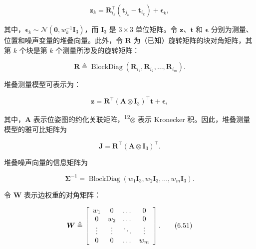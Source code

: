 \begin{equation}
\boldsymbol {z} _ {k} = \boldsymbol {R} _ {i _ {k}} ^ {\top} (\boldsymbol {t} _ {j _ {k}} - \boldsymbol {t} _ {i _ {k}}) + \boldsymbol {\epsilon} _ {k},\tag{6.46}
\end{equation}

其中，$\boldsymbol {\epsilon} _ { k } \sim \mathcal {N} ( \mathbf {0} , w _ { k } ^ { - 1 } \mathbf {I} _ { 3 } )$，而 $\mathbf { I } _ { 3 }$ 是 $3 \times 3$ 单位矩阵。令 $\pmb{z}$、$\pmb{t}$ 和 $\pmb{\epsilon}$ 分别为测量、位置和噪声变量的堆叠向量。此外，令 $\pmb{R}$ 为（已知）旋转矩阵的块对角矩阵，其第 $k$ 个块是第 $k$ 个测量所涉及的旋转矩阵：

\begin{equation}
\boldsymbol {R} \triangleq \operatorname{BlockDiag} \left(\boldsymbol {R} _ {i _ {1}}, \boldsymbol {R} _ {i _ {2}}, \dots , \boldsymbol {R} _ {i _ {m}}\right).\tag{6.47}
\end{equation}

堆叠测量模型可表示为：

\begin{equation}
\pmb {z} = \pmb {R} ^ {\top} (\pmb {A} \otimes \mathbf {I} _ {3}) ^ {\top} \pmb {t} + \pmb {\epsilon},\tag{6.48}
\end{equation}

其中，$\pmb{A}$ 表示位姿图的约化关联矩阵，\textsuperscript{12}$\otimes$ 表示 Kronecker 积。因此，堆叠测量模型的雅可比矩阵为

\begin{equation}
\boldsymbol {J} = \boldsymbol {R} ^ {\top} (\boldsymbol {A} \otimes \mathbf {I} _ {3}) ^ {\top}.\tag{6.49}
\end{equation}

堆叠噪声向量的信息矩阵为

\begin{equation}
\boldsymbol {\Sigma} ^ {- 1} = \operatorname{BlockDiag} \left(w _ {1} \mathbf {I} _ {3}, w _ {2} \mathbf {I} _ {3}, \dots , w _ {m} \mathbf {I} _ {3}\right).\tag{6.50}
\end{equation}

令 $\pmb{W}$ 表示边权重的对角矩阵：

\begin{equation}
\boldsymbol {W} \triangleq \left[ \begin{array}{c c c c} w _ {1} & 0 & \dots & 0 \\ 0 & w _ {2} & \dots & 0 \\ \vdots & \vdots & \ddots & \vdots \\ 0 & 0 & \dots & w _ {m} \end{array} \right].\tag{6.51}
\end{equation}


